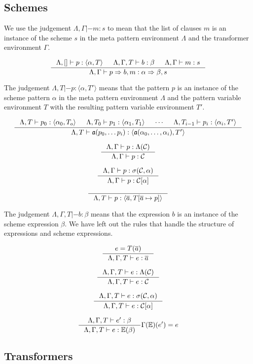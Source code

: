 \documentclass[oneside]{memoir}
\theoremstyle{definition}
\begin{document}
\subsection{Schemes}
We use the judgement $\Lambda, \Gamma |- m : s$ to mean that the list of clauses $m$ is
an instance of the scheme $s$ in the meta pattern environment $\Lambda$ and the
transformer environment $\Gamma$.

\[
\inference{\Lambda, [] |- p : \langle \alpha, T \rangle &
  \Lambda, \Gamma, T |- b : \beta &
\Lambda, \Gamma |- m : s}
{\Lambda, \Gamma |- p => b, m : \alpha => \beta, s}
\]

The judgement $\Lambda, T |- p : \langle \alpha, T' \rangle$ means that the
pattern $p$ is an instance of the scheme pattern $\alpha$ in the meta pattern
environment $\Lambda$ and the pattern variable environment $T$ with the
resulting pattern variable environment $T'$.

\[
\inference{\Lambda, T |- p_0 : \langle \alpha_0, T_o \rangle &
\Lambda, T_0 |- p_1 : \langle \alpha_1, T_1 \rangle &
\cdots &
\Lambda, T_{i-1} |- p_i : \langle \alpha_i, T' \rangle
}
{\Lambda, T |- \mathfrak{a}(p_0, \ldots p_i) : \langle \mathfrak{a}(\alpha_0,
  \ldots, \alpha_i), T' \rangle}
\]

\[
\inference
{\Lambda, \Gamma |- p : \Lambda(\mathcal{C})}
{\Lambda, \Gamma |- p : \mathcal{C}}
\]

\[
\inference
{\Lambda, \Gamma |- p : \sigma(\mathcal{C}, \alpha)}
{\Lambda, \Gamma |- p : \mathcal{C}[\alpha]}
\]

\[
\inference{}
{\Lambda, T |- p : \langle \overline{a}, T[\overline{a} \mapsto p] \rangle}
\]

The judgement $\Lambda, \Gamma, T |- b : \beta$ means that the expression $b$ is
an instance of the scheme expression $\beta$. We have left out the rules that
handle the structure of expressions and scheme expressions.

\[
\inference{e = T(\overline{a})}
{\Lambda, \Gamma, T |- e : \overline{a}}
\]

\[
\inference{\Lambda, \Gamma, T |- e : \Lambda(\mathcal{C})}
{\Lambda, \Gamma, T |- e : \mathcal{C}}
\]

\[
\inference
{\Lambda, \Gamma, T |- e : \sigma(\mathcal{C}, \alpha)}
{\Lambda, \Gamma, T |- e : \mathcal{C}[\alpha]}
\]

\[
\inference{\Lambda, \Gamma, T |- e' : \beta}
{\Lambda, \Gamma, T |- e : \mathbb{E}(\beta)}{\Gamma(\mathbb{E})(e') = e}
\]

\subsection{Transformers}
\end{document}
